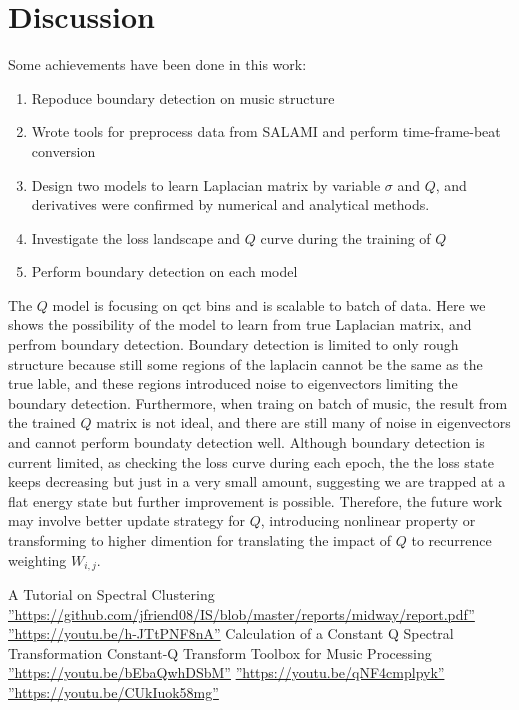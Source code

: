 \documentclass[final]{siamltexmm}
\begin{document}
\section{Discussion}
Some achievements have been done in this work:
\begin{enumerate}
\item Repoduce boundary detection on music structure
\item Wrote tools for preprocess data from SALAMI and perform time-frame-beat conversion
\item Design two models to learn Laplacian matrix by variable $\sigma$ and $Q$, and derivatives were confirmed by numerical and analytical methods.
\item Investigate the loss landscape and $Q$ curve during the training of $Q$
\item Perform boundary detection on each model
\end{enumerate}

The $Q$ model is focusing on qct bins and is scalable to batch of data. Here we shows the possibility of the model to learn from true Laplacian matrix, and perfrom boundary detection. Boundary detection is limited to only rough structure because still some regions of the laplacin cannot be the same as the true lable, and these regions introduced noise to eigenvectors limiting the boundary detection. Furthermore, when traing on batch of music, the result from the trained $Q$ matrix is not ideal, and there are still many of noise in eigenvectors and cannot perform boundaty detection well. Although boundary detection is current limited, as checking the loss curve during each epoch, the the loss state keeps decreasing but just in a very small amount, suggesting we are trapped at a flat energy state but further improvement is possible. Therefore, the future work may involve better update strategy for $Q$, introducing nonlinear property or transforming to higher dimention for translating the impact of $Q$ to recurrence weighting $W_{i,j}$.

\begin{thebibliography}{10}
 {\sc A Tutorial on Spectral Clustering}
 \hyperref[baseline]{''https://github.com/jfriend08/IS/blob/master/reports/midway/report.pdf''}
 \hyperref[singleII Alpha100000II ]{''https://youtu.be/h-JTtPNF8nA''}
 {\sc Calculation of a Constant Q Spectral Transformation}
 {\sc Constant-Q Transform Toolbox for Music Processing}
 \hyperref[OnlyOne Alpha5_GM ]{''https://youtu.be/bEbaQwhDSbM''}
 \hyperref[Q_oneSong_Alpha5]{''https://youtu.be/qNF4cmplpyk''}
 \hyperref[Q_batchMusic A50]{''https://youtu.be/CUkIuok58mg''}
\end{thebibliography}
\end{document}
